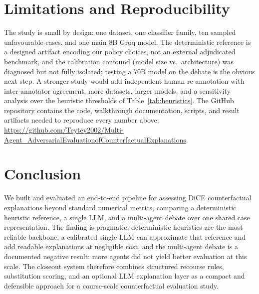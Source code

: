 \documentclass[letterpaper]{article}
\begin{document}
\section{Limitations and Reproducibility}
The study is small by design: one dataset, one classifier family, ten sampled unfavourable cases, and one main 8B Groq model. The deterministic reference is a designed artifact encoding our policy choices, not an external adjudicated benchmark, and the calibration confound (model size vs.\ architecture) was diagnosed but not fully isolated; testing a 70B model on the debate is the obvious next step. A stronger study would add independent human re-annotation with inter-annotator agreement, more datasets, larger models, and a sensitivity analysis over the heuristic thresholds of Table~\ref{tab:heuristics}. The GitHub repository contains the code, walkthrough documentation, scripts, and result artifacts needed to reproduce every number above: \url{https://github.com/Teytey2002/Multi-Agent_AdversarialEvaluationofCounterfactualExplanations}.

\section{Conclusion}
We built and evaluated an end-to-end pipeline for assessing DiCE counterfactual explanations beyond standard numerical metrics, comparing a deterministic heuristic reference, a single LLM, and a multi-agent debate over one shared case representation. The finding is pragmatic: deterministic heuristics are the most reliable backbone, a calibrated single LLM can approximate that reference and add readable explanations at negligible cost, and the multi-agent debate is a documented negative result: more agents did not yield better evaluation at this scale. The closeout system therefore combines structured recourse rules, substitution scoring, and an optional LLM explanation layer as a compact and defensible approach for a course-scale counterfactual evaluation study.


\end{document}
